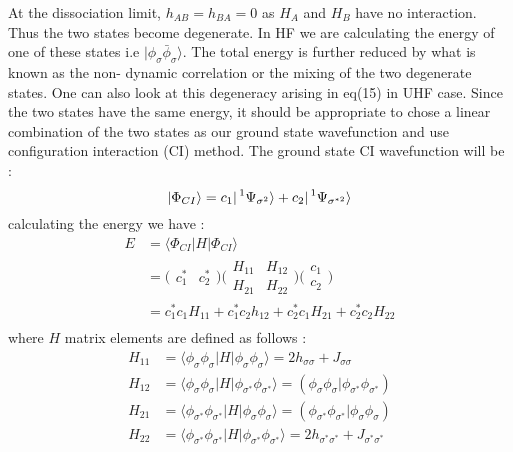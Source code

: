 \documentclass[11pt]{article}   	%
\begin{document}
	At the dissociation limit, $h_{AB}=h_{BA}=0$ as $H_A$ and $H_B$ have no interaction. 
	Thus the two states become degenerate. In HF we are calculating the energy of one of these 
	states i.e $|\phi_{\sigma}\bar{\phi}_{\sigma}\rangle$. The total energy is further reduced by what is known as the non-
	dynamic correlation or the mixing of the two degenerate states. 
	One can also look at this degeneracy arising in eq(15) in UHF case. 
	Since the two states have the same energy, it should be appropriate to chose a linear 
	combination of the two states as our ground state wavefunction and use configuration 
	interaction (CI) method. The ground state CI wavefunction will be :\\
	\begin{equation}
		|\Phi_{CI}\rangle=c_1|\prescript{1}{}{\Psi_{\sigma^2}}\rangle+c_2|\prescript{1}{}{\Psi_{\sigma^{*2}}}\rangle
	\end{equation}
	calculating the energy we have :\\
	\begin{equation}
	\begin{split}
		E&=\langle\Phi_{CI}|H|\Phi_{CI}\rangle\\
		 &=\big( \begin{matrix} c_1^* & c_2^* \end{matrix} \big)\bigg(\begin{matrix} H_{11} & H_{12} \\ H_{21} & H_{22} \end{matrix}\bigg)
			 \bigg( \begin{matrix} c_1\\c_2\end{matrix}\bigg)\\
		 &=c_1^*c_1H_{11}+c_1^*c_2h_{12}+c_2^*c_1H_{21}+c_2^*c_2H_{22}\\
	\end{split}
	\end{equation}
	where $H$ matrix elements are defined as follows :\\
	\begin{equation}
	\begin{split}
		H_{11}&=\langle\phi_{\sigma}\phi_{\sigma}|H|\phi_{\sigma}\phi_{\sigma}\rangle=2 h_{\sigma\sigma}+J_{\sigma\sigma}\\
		H_{12}&=\langle\phi_{\sigma}\phi_{\sigma}|H|\phi_{\sigma^*}\phi_{\sigma^*}\rangle=(\phi_{\sigma}
		\phi_{\sigma}|\phi_{\sigma^*}\phi_{\sigma^*})\\
		H_{21}&=\langle\phi_{\sigma^*}\phi_{\sigma^*}|H|\phi_{\sigma}\phi_{\sigma}\rangle=(\phi_{\sigma^*}
		\phi_{\sigma^*}|\phi_{\sigma}\phi_{\sigma})\\
		H_{22}&=\langle\phi_{\sigma^*}\phi_{\sigma^*}|H|\phi_{\sigma^*}\phi_{\sigma^*}\rangle=2 h_
		{\sigma^*\sigma^*}+J_{\sigma^*\sigma^*}
	\end{split}
	\end{equation}
\end{document}
